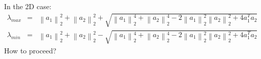 \documentclass{article}
\newcommand{\ea}[1]{\begin{eqnarray*}#1\end{eqnarray*}}
\newcommand{\twonorm}[1]{\left\|{#1}\right\|_{2}}
\begin{document}
In the 2D case:
\ea{
\lambda_{max} &=&  \twonorm{a_1}^2 + \twonorm{a_2}^2 + \sqrt{ \twonorm{a_1}^4 + \twonorm{a_2}^4 - 2 \twonorm{a_1}^2 \twonorm{a_2}^2 + 4 a_1^Ta_2 }  \\
\lambda_{min} &=&  \twonorm{a_1}^2 + \twonorm{a_2}^2 - \sqrt{ \twonorm{a_1}^4 + \twonorm{a_2}^4 - 2 \twonorm{a_1}^2 \twonorm{a_2}^2 + 4 a_1^Ta_2 }  
}
How to proceed?
\end{document}
